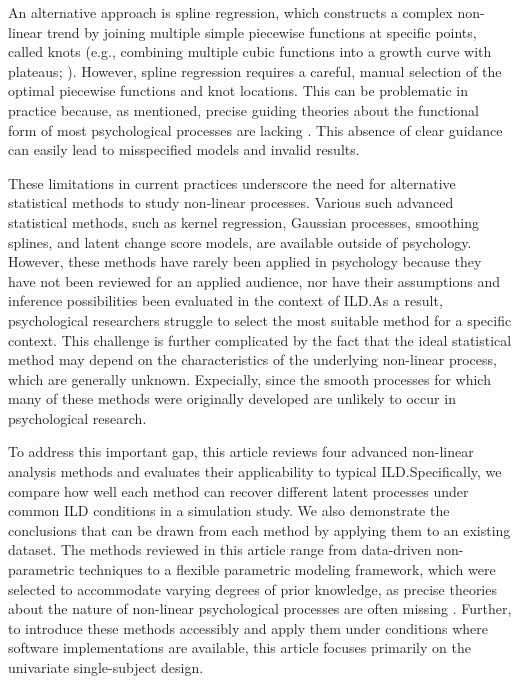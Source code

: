\documentclass[man, floatsintext]{apa7}
\begin{document}
An alternative approach is spline regression, which constructs a complex
non-linear trend by joining multiple simple piecewise functions at specific
points, called knots (e.g., combining multiple cubic functions into a growth
curve with plateaus; \textcite{tsay_nonlinear_2019}). However, spline
regression requires a careful, manual selection of the optimal piecewise
functions and
knot locations. This can be problematic in practice because, as mentioned,
precise guiding theories about the functional form of most psychological
processes are lacking \parencite{tan_time-varying_2011}. This absence of clear
guidance can easily lead to misspecified models and invalid results.

These limitations in current practices underscore the need for alternative
statistical methods to study non-linear processes. Various
such advanced statistical
methods, such as kernel regression, Gaussian processes, smoothing splines, and
latent change score models, are available outside of psychology. However, these
methods have rarely been applied in psychology because they have not been
reviewed for an applied audience, nor have their assumptions and inference
possibilities been evaluated in the context of ILD.\@ As a result,
psychological researchers struggle to select the most suitable method for a
specific context. This challenge is further complicated by the fact that the
ideal statistical method may depend on the characteristics of the underlying
non-linear process, which are generally unknown. Expecially, since the smooth
processes for which many of these methods were originally developed are
unlikely to occur in psychological research.

To address this important gap, this article reviews four advanced non-linear
analysis
methods and evaluates their applicability to typical ILD.\@ Specifically, we
compare how well each method can recover different latent processes under
common ILD conditions in a simulation study. We also demonstrate the
conclusions that can be drawn from each method by applying them to an existing
dataset. The methods reviewed in this article range from data-driven
non-parametric techniques to a flexible parametric modeling framework, which
were selected to accommodate varying degrees of prior knowledge, as
precise theories about the nature of non-linear psychological processes are
often missing \parencite{tan_time-varying_2011}. Further, to introduce these
methods accessibly and apply them under conditions where software
implementations are available, this article focuses primarily on the univariate
single-subject design.
\end{document}
